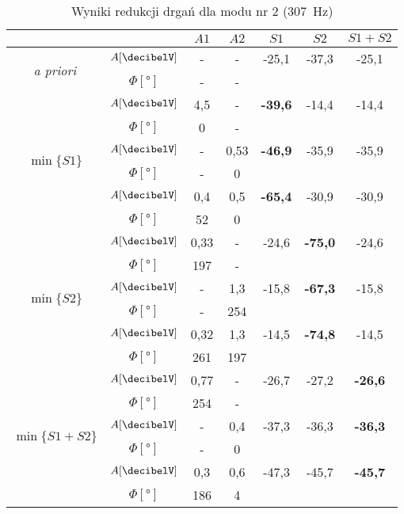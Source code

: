 \documentclass[polish,a4paper,11pt]{mwart}
\begin{document}
  \begin{table}[!tbh]
    \centering
    \caption{Wyniki redukcji drgań dla modu nr 2 (\SI{307}{\hertz})}
    \label{tab:red2}
    \begin{tabular}{|c|c|c|c|c|c|c|}
      \cline{3-7}
      \multicolumn{2}{c|}{}&$A1$&$A2$&$S1$&$S2$&$S1+S2$\\\hline
      \multirow{2}{*}{\textit{a priori}} & $A [\si{\decibelV}]$ & - & - & -25,1 & -37,3 & -25,1\\\cline{2-7}
					 & $\Phi [\si{\degree}]$ & - & - & \multicolumn{3}{c}{}\\\hline
      \multirow{6}{*}{$\min\{S1\}$}   &   $A [\si{\decibelV}]$ & 4,5 & - & \textbf{-39,6} & -14,4 & -14,4\\\cline{2-7}
				      &$\Phi [\si{\degree}]$ & 0 & - & \multicolumn{3}{c}{}\\\cline{2-7}
				      &   $A [\si{\decibelV}]$ & - & 0,53 & \textbf{-46,9} & -35,9 & -35,9\\\cline{2-7}
				      &$\Phi [\si{\degree}]$ & - & 0 & \multicolumn{3}{c}{}\\\cline{2-7}
				      &   $A [\si{\decibelV}]$ & 0,4 & 0,5 & \textbf{-65,4} & -30,9 & -30,9\\\cline{2-7}
				      &$\Phi [\si{\degree}]$ & 52 & 0 & \multicolumn{3}{c}{}\\\hline
      \multirow{6}{*}{$\min\{S2\}$}   &   $A [\si{\decibelV}]$ & 0,33 & - & -24,6 & \textbf{-75,0} & -24,6\\\cline{2-7}
				      &$\Phi [\si{\degree}]$ & 197 & - & \multicolumn{3}{c}{}\\\cline{2-7}
				      &   $A [\si{\decibelV}]$ & - & 1,3 & -15,8 & \textbf{-67,3} & -15,8\\\cline{2-7}
				      &$\Phi [\si{\degree}]$ & - & 254 & \multicolumn{3}{c}{}\\\cline{2-7}
				      &   $A [\si{\decibelV}]$ & 0,32 & 1,3 & -14,5 & \textbf{-74,8} & -14,5\\\cline{2-7}
				      &$\Phi [\si{\degree}]$ & 261 & 197 & \multicolumn{3}{c}{}\\\hline
      \multirow{6}{*}{$\min\{S1+S2\}$}&   $A [\si{\decibelV}]$ & 0,77 & - & -26,7 & -27,2 & \textbf{-26,6} \\\cline{2-7}
				      &$\Phi [\si{\degree}]$ & 254 & - & \multicolumn{3}{c}{}\\\cline{2-7}
				      &   $A [\si{\decibelV}]$ & - & 0,4 & -37,3 & -36,3 & \textbf{-36,3} \\\cline{2-7}
				      &$\Phi [\si{\degree}]$ & - & 0 & \multicolumn{3}{c}{}\\\cline{2-7}
				      &   $A [\si{\decibelV}]$ & 0,3 & 0,6 & -47,3 & -45,7 & \textbf{-45,7} \\\cline{2-7}
				      &$\Phi [\si{\degree}]$ & 186 & 4 & \multicolumn{3}{c}{}\\\cline{1-4}
    \end{tabular}
  \end{table}
\end{document}
